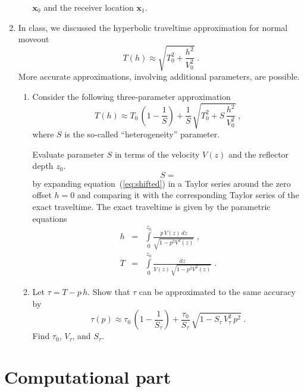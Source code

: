 \begin{enumerate}
\begin{enumerate}
    $\mathbf{x}_0$ and the receiver location $\mathbf{x}_1$.
  \end{enumerate}
\item In class, we discussed the hyperbolic traveltime approximation for normal moveout
  \begin{equation}
  \label{eq:hyper2}
  T(h) \approx \sqrt{T_0^2 + \frac{h^2}{V_0^2}}\;.
\end{equation}
More accurate approximations, involving additional parameters, are possible.
\begin{enumerate}
\item Consider the following three-parameter approximation
  \begin{equation}
    \label{eq:shifted}
    T(h) \approx T_0\,\left(1-\frac{1}{S}\right) + 
\frac{1}{S}\,\sqrt{T_0^2+S\,\frac{h^2}{V_0^2}}\;,
  \end{equation}
  where $S$ is the so-called ``heterogeneity'' parameter. 

Evaluate parameter $S$ in terms of the velocity $V(z)$ and the reflector depth $z_0$.
\begin{equation}
  \label{eq:a}
  S =
\end{equation}
by expanding
  equation~(\ref{eq:shifted}) in a Taylor series around the zero offset
  $h=0$ and comparing it with the corresponding Taylor series of the exact
  traveltime. The exact traveltime is given by the parametric equations
  \begin{eqnarray}
\label{eq:xofp}
h & = & \int\limits_0^{z_0} \frac{p\,V(z)\,dz}{\sqrt{1-p^2 V^2(z)}}\;, \\
\label{eq:tofp}
T & = & \int\limits_0^{z_0} \frac{dz}{V(z)\,\sqrt{1-p^2 V^2(z)}}\;.
\end{eqnarray}
\item Let $\tau = T-p\,h$. Show that $\tau$ can be approximated to the same accuracy by
\begin{equation}
    \label{eq:tauofp}
    \tau(p) \approx \displaystyle \tau_0\,\left(1-\frac{1}{S_{\tau}}\right) + 
\frac{\tau_0}{S_{\tau}}\,\sqrt{1-S_{\tau}\,{V_{\tau}^2}\,p^2}\;.
  \end{equation}
Find $\tau_0$, $V_{\tau}$, and $S_{\tau}$.
\end{enumerate}
\end{enumerate}

\lstset{language=python,numbers=left,numberstyle=\tiny,showstringspaces=false}

\newpage


\section{Computational part}

